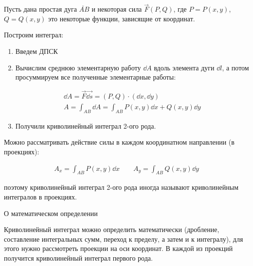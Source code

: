 
Пусть дана простая дуга \(\breve{AB}\) и некоторая сила \(\vec{F}(P, Q)\), где
\(P = P(x, y)\), \(Q = Q(x, y)\) это некоторые функции, зависящие от координат.

Построим интеграл:
\begin{enumerate}
  \item Введем ДПСК
  \item Вычислим среднюю элементарную работу \(\dd A\) вдоль элемента дуги
  \(\dd l\), а потом просуммируем все полученные элементарные работы:
  
  \begin{multicols}{2}
    \begin{align*}
      \dd A = \vec{F} \vec{\dd s} = (P, Q) \cdot (\dd x, \dd y) \\
      A = \int_{AB} \dd A = \int_{AB} P(x, y) \dd x + Q(x, y) \dd y
    \end{align*}
    \columnbreak

    
  \end{multicols}

  \item Получили криволинейный интеграл 2-ого рода.
\end{enumerate}

\begin{remark}
  Можно рассматривать действие силы в каждом координатном направлении
  (в проекциях):

  \begin{align*}
    A_{x} = \int_{AB} P(x, y) \dd x \qquad
    A_{y} = \int_{AB} Q(x, y) \dd y
  \end{align*}

  поэтому криволинейный интеграл 2-ого рода иногда называют криволинейным
  интегралов в проекциях.
\end{remark}

\begin{remark}
  О математическом определении

  Криволинейный интеграл можно определить математически (дробление, составление
  интегральных сумм, переход к пределу, а затем и к интегралу), для этого нужно
  рассмотреть проекции на оси координат. В каждой из проекций получится
  криволинейный интеграл первого рода.
\end{remark}

